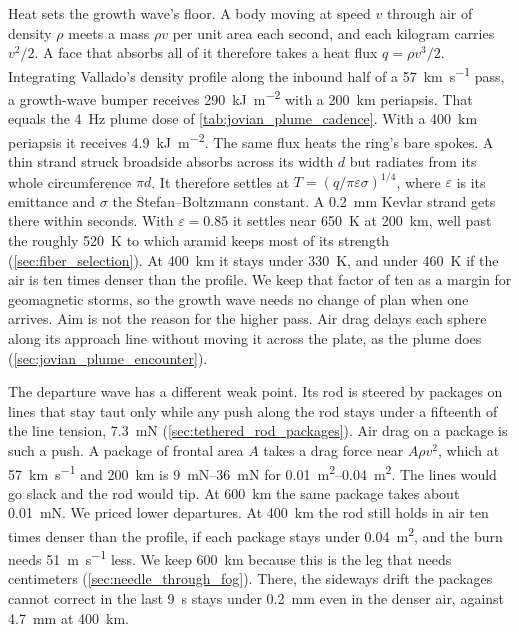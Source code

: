 \documentclass{article}
\begin{document}
Heat sets the growth wave's floor. A body moving at speed $v$ through air of density $\rho$ meets a mass $\rho v$ per unit area each second, and each kilogram carries $v^2/2$. A face that absorbs all of it therefore takes a heat flux $q=\rho v^3/2$. Integrating Vallado's density profile \cite{vallado_atmosexp} along the inbound half of a \SI{57}{\kilo\meter\per\second} pass, a growth-wave bumper receives \SI{290}{\kilo\joule\per\square\meter} with a \SI{200}{\kilo\meter} periapsis. That equals the \SI{4}{\hertz} plume dose of \autoref{tab:jovian_plume_cadence}. With a \SI{400}{\kilo\meter} periapsis it receives \SI{4.9}{\kilo\joule\per\square\meter}. The same flux heats the ring's bare spokes. A thin strand struck broadside absorbs across its width $d$ but radiates from its whole circumference $\pi d$. It therefore settles at $T=(q/\pi\varepsilon\sigma)^{1/4}$, where $\varepsilon$ is its emittance and $\sigma$ the Stefan--Boltzmann constant. A \SI{0.2}{\milli\meter} Kevlar strand gets there within seconds. With $\varepsilon=0.85$ it settles near \SI{650}{\kelvin} at \SI{200}{\kilo\meter}, well past the roughly \SI{520}{\kelvin} to which aramid keeps most of its strength (\autoref{sec:fiber_selection}). At \SI{400}{\kilo\meter} it stays under \SI{330}{\kelvin}, and under \SI{460}{\kelvin} if the air is ten times denser than the profile. We keep that factor of ten as a margin for geomagnetic storms, so the growth wave needs no change of plan when one arrives. Aim is not the reason for the higher pass. Air drag delays each sphere along its approach line without moving it across the plate, as the plume does (\autoref{sec:jovian_plume_encounter}).

The departure wave has a different weak point. Its rod is steered by packages on lines that stay taut only while any push along the rod stays under a fifteenth of the line tension, \SI{7.3}{\milli\newton} (\autoref{sec:tethered_rod_packages}). Air drag on a package is such a push. A package of frontal area $A$ takes a drag force near $A\rho v^2$, which at \SI{57}{\kilo\meter\per\second} and \SI{200}{\kilo\meter} is \SIrange{9}{36}{\milli\newton} for \SIrange{0.01}{0.04}{\square\meter}. The lines would go slack and the rod would tip. At \SI{600}{\kilo\meter} the same package takes about \SI{0.01}{\milli\newton}. We priced lower departures. At \SI{400}{\kilo\meter} the rod still holds in air ten times denser than the profile, if each package stays under \SI{0.04}{\square\meter}, and the burn needs \SI{51}{\meter\per\second} less. We keep \SI{600}{\kilo\meter} because this is the leg that needs centimeters (\autoref{sec:needle_through_fog}). There, the sideways drift the packages cannot correct in the last \SI{9}{\second} stays under \SI{0.2}{\milli\meter} even in the denser air, against \SI{4.7}{\milli\meter} at \SI{400}{\kilo\meter}.
\end{document}

